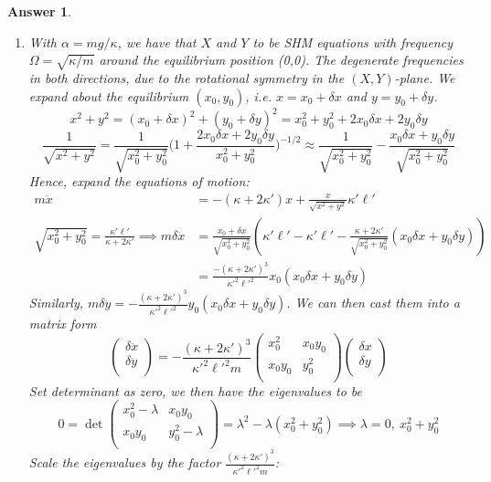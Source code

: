 \documentclass[a4paper]{article}
\newtheorem{ans}{Answer}[section]
\theoremstyle{new}
\begin{document}
\begin{ans}
\begin{enumerate}[label=(\alph*)]
$$\sqrt{x^2+y^2}=\frac{\kappa'\ell'}{\kappa+2\kappa'}$$
\item With $\alpha=mg/\kappa$, we have that $X$ and $Y$ to be SHM equations with frequency $\Omega=\sqrt{\kappa/m}$ around the equilibrium position (0,0). The degenerate frequencies in both directions, due to the rotational symmetry in the $(X,Y)$-plane. We expand about the equilibrium $(x_0,y_0)$, i.e. $x=x_0+\delta x$ and $y=y_0+\delta y$. 
$$x^2+y^2=(x_0+\delta x)^2+(y_0+\delta y)^2=x_0^2+y_0^2+2x_0\delta x+2y_0\delta y$$
$$\frac{1}{\sqrt{x^2+y^2}}=\frac{1}{\sqrt{x_0^2+y_0^2}}\bigg(1+\frac{2x_0\delta x+2y_0\delta y}{x_0^2+y_0^2}\bigg)^{-1/2}\approx\frac{1}{\sqrt{x_0^2+y_0^2}}-\frac{x_0\delta x+y_0\delta y}{\sqrt{x_0^2+y_0^2}}$$
Hence, expand the equations of motion:
\begin{align}
m\ddot{x}&=-(\kappa+2\kappa')x+\frac{x}{\sqrt{x^2+y^2}}\kappa'\ell'\nonumber\\\sqrt{x_0^2+y_0^2}=\frac{\kappa'\ell'}{\kappa+2\kappa'}\implies m\delta\ddot{x}&=\frac{x_0+\delta x}{\sqrt{x_0^2+y_0^2}}(\kappa'\ell'-\kappa'\ell'-\frac{\kappa+2\kappa'}{\sqrt{x_0^2+y_0^2}}(x_0\delta x+y_0\delta y))\nonumber\\&=\frac{-(\kappa+2\kappa')^3}{\kappa'^2\ell'^2}x_0(x_0\delta x+y_0\delta y)\nonumber
\end{align}
Similarly, $m\delta\ddot{y}=-\frac{(\kappa+2\kappa')^3}{\kappa'^2\ell'^2}y_0(x_0\delta x+y_0\delta y)$. We can then cast them into a matrix form
$$\begin{pmatrix}\delta\ddot{x}\\\delta\ddot{y}\\\end{pmatrix}=-\frac{(\kappa+2\kappa')^3}{\kappa'^2\ell'^2m}\begin{pmatrix}x_0^2&x_0y_0\\x_0y_0&y_0^2\\\end{pmatrix}\begin{pmatrix}\delta x\\\delta y\\\end{pmatrix}$$
Set determinant as zero, we then have the eigenvalues to be
$$0=\det\begin{pmatrix}x_0^2-\lambda&x_0y_0\\x_0y_0&y_0^2-\lambda\\\end{pmatrix}=\lambda^2-\lambda(x_0^2+y_0^2)\implies\lambda=0,~x_0^2+y_0^2$$
Scale the eigenvalues by the factor $\frac{(\kappa+2\kappa')^3}{\kappa'^2\ell'^2m}$:

\end{enumerate}
\end{ans}
\end{document}
